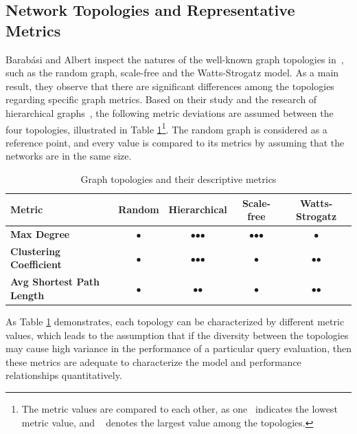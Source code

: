 \subsection{Network Topologies and Representative Metrics} \label{sec:topology_metric}

Barabási and Albert inspect the natures of the well-known graph topologies in~\cite{statistical_mechanics}, such as the random graph, scale-free and the Watts-Strogatz model. As a main result, they observe that there are significant differences among the topologies regarding specific graph metrics. Based on their study and the research of hierarchical graphs~\cite{hierarchical}, the following metric deviations are assumed between the four topologies, illustrated in Table \ref{tab:topology_metrics}\footnote{The metric values are compared to each other, as one \textbullet ~indicates the lowest metric value, and  \textbullet\textbullet\textbullet~ denotes the largest value among the topologies.}. The random graph is considered as a reference point, and every value is compared to its metrics by assuming that the networks are in the same size.
\begin{table}[ht]
	\footnotesize
	\centering
	\begin{tabular}{ l c c c c}
		\toprule
		Metric & Random & Hierarchical & Scale-free & Watts-Strogatz \\ 
		\midrule 
		\textbf{Max Degree} & $\bullet$ & $\bullet$$\bullet$$\bullet$ & $\bullet$$\bullet$$\bullet$ & $\bullet$ \\ \hline
		\textbf{Clustering Coefficient} & $\bullet$ & $\bullet$$\bullet$$\bullet$ & $\bullet$ & $\bullet$$\bullet $\\ \hline
		\textbf{Avg Shortest Path Length} & $\bullet$ & $\bullet$$\bullet$ & $\bullet$ & $\bullet$$\bullet$ \\ \hline
		\bottomrule
	\end{tabular}
	\caption{Graph topologies and their descriptive metrics}
	\label{tab:topology_metrics}
\end{table}
As Table \ref{tab:topology_metrics} demonstrates, each topology can be characterized by different metric values, which leads to the assumption that if the diversity between the topologies may cause high variance in the performance of a particular query evaluation, then these metrics are adequate to characterize the model and performance relationships quantitatively.


